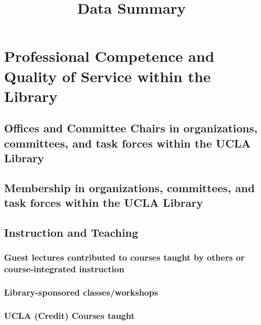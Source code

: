 \documentclass[12pt, oneside]{article}
\title{Data Summary}
\begin{document}
\date{}
\maketitle
\thispagestyle{fancy}



\section{Professional Competence and Quality of Service within the Library}

\subsection{Offices and Committee Chairs in organizations, committees, and task forces within the UCLA Library}



\subsection{Membership in organizations, committees, and task forces within the UCLA Library}



\subsection{Instruction and Teaching}

\subsubsection{Guest lectures contributed to courses taught by others or course-integrated instruction}

\subsubsection{Library-sponsored classes/workshops}
\nocite{*}
\printbibliography[keyword={lib-service_lib-sponsored},title={Library-sponsored classes/workshops},heading=none]

\subsubsection{UCLA (Credit) Courses taught}
\end{document}
